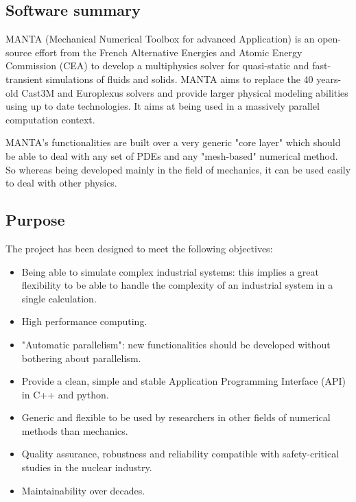 \subsection{Software summary}
\label{sec:MANTA:summary}

MANTA (Mechanical Numerical Toolbox for advanced Application) is an open-source
effort from the French Alternative Energies and Atomic Energy Commission (CEA) to develop a
multiphysics solver for quasi-static and fast-transient simulations of fluids and solids. MANTA aims
to replace the 40 years-old Cast3M and Europlexus solvers and provide larger physical modeling
abilities using up to date technologies. It aims at being used in a massively parallel computation context.

MANTA's functionalities are built over a very generic "core layer" which should be able to deal
with any set of PDEs and any "mesh-based" numerical method. So whereas being developed mainly in the
field of mechanics, it can be used easily to deal with other physics.

\subsection{Purpose}
\label{sec:MANTA:purpose}

The project has been designed to meet the following objectives:
\begin{itemize}
    \item Being able to simulate complex industrial systems: this implies a great flexibility to be able to handle the complexity of an industrial system in a single calculation.
    \item High performance computing.
    \item "Automatic parallelism": new functionalities should be developed without bothering about parallelism.
    \item Provide a clean, simple and stable Application Programming Interface (API) in C++ and python.
    \item Generic and flexible to be used by researchers in other fields of numerical methods than mechanics.
    \item Quality assurance, robustness and reliability compatible with safety-critical studies in the
nuclear industry.
    \item Maintainability over decades.
\end{itemize}

